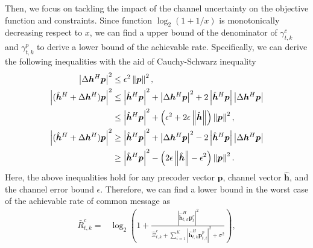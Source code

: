 \documentclass[twocolumn,journal]{IEEEtran}
\begin{document}
Then, we focus on tackling the impact of the channel uncertainty on the objective function and constraints. 
Since function \(\log_2(1+1/x)\) is monotonically decreasing respect to \(x\), we can find a upper bound of the denominator of \(\gamma^{c}_{t,k}\) and \(\gamma^{p}_{t,k}\) to derive a lower bound of the achievable rate. Specifically, we can derive the following inequalities with the aid of Cauchy-Schwarz inequality \cite{xuResource2025}
\begin{subequations}
\begin{align}
    \left| \Delta\boldsymbol{h}^{H}\boldsymbol{p}\right|^2 &\leq \epsilon^2\left\Vert \boldsymbol{p} \right\Vert^2,\\
    \left| (\hat{\boldsymbol{h}}^{H} + \Delta\boldsymbol{h}^{H})\boldsymbol{p}\right|^2 &\leq \left| \hat{\boldsymbol{h}}^{H}\boldsymbol{p}\right|^2+\left| \Delta\boldsymbol{h}^{H}\boldsymbol{p}\right|^2 + 2\left|\hat{\boldsymbol{h}}^{H}\boldsymbol{p}\right|\left|\Delta\boldsymbol{h}^{H}\boldsymbol{p}\right| \notag\\
    &\leq \left| \hat{\boldsymbol{h}}^{H}\boldsymbol{p}\right|^2 + \left(\epsilon^2+2\epsilon\left\Vert \hat{\boldsymbol{h}} \right\Vert \right)\left\Vert \boldsymbol{p} \right\Vert^2,\\
    \left| (\hat{\boldsymbol{h}}^{H} + \Delta\boldsymbol{h}^{H})\boldsymbol{p}\right|^2 &\geq \left| \hat{\boldsymbol{h}}^{H}\boldsymbol{p}\right|^2+\left| \Delta\boldsymbol{h}^{H}\boldsymbol{p}\right|^2 - 2\left|\hat{\boldsymbol{h}}^{H}\boldsymbol{p}\right|\left|\Delta\boldsymbol{h}^{H}\boldsymbol{p}\right|\notag\\
    &\geq \left| \hat{\boldsymbol{h}}^{H}\boldsymbol{p}\right|^2 - \left(2\epsilon\left\Vert \hat{\boldsymbol{h}} \right\Vert - \epsilon^2 \right)\left\Vert \boldsymbol{p} \right\Vert^2.
\end{align}
\end{subequations}
Here, the above inequalities hold for any precoder vector \(\boldsymbol{p}\), channel vector \(\hat{\boldsymbol{h}}\), and the channel error bound \(\epsilon\).
Therefore, we can find a lower bound in the worst case of the achievable rate of common message as
\begin{align}
    \bar{R}^{c}_{t,k} =& \log_2\left(1 + \frac{\left| \hat{\boldsymbol{h}}^{H}_{t,k}\boldsymbol{p}^{c}_{t} \right|^2}{\hat{\Xi}^{c}_{t,k} +  \sum_{i=1}^{K}\left| \hat{\boldsymbol{h}}^{H}_{t,k}\boldsymbol{p}^{p}_{t,i}\right|^2 + \sigma^2}\right), \label{eq:lowerBoundRc}
\end{align}
\end{document}
